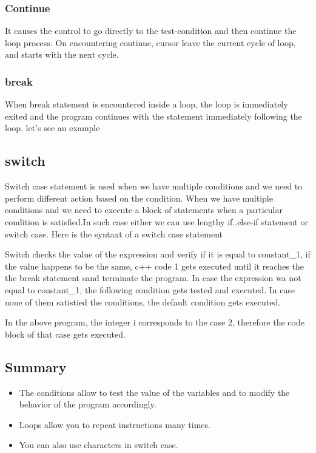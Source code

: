 \documentclass[11pt, a4paper]{article}
\begin{document}
\subsubsection{Continue}
It causes the control to go directly to the test-condition and then continue the loop process.
On encountering continue, cursor leave the current cycle of loop, and starts with the next cycle.


\subsubsection{break}
When break statement is encountered inside a loop, the loop is immediately exited and the program
continues with the statement immediately following the loop. let's see an example


\subsection{switch}
Switch case statement is used when we have multiple conditions and we need to perform different
action based on the condition. When we have multiple conditions and we need to execute a block of
statements when a particular condition is satisfied.In such case either we can use lengthy
if..else-if statement or switch case. Here is the syntaxt of a switch case statement

Switch checks the value of the expression and verify if it is equal to constant\_1, if the value happens
to be the same, c++ code 1 gets executed until it reaches the the break statement sand terminate the
program. In case the expression wa not equal to constant\_1, the following condition gets tested
and executed. In case none of them satistied the conditions, the default condition gets executed.

In the above program, the integer i corresponds to the case 2, therefore the code block of that
case gets executed.

\subsection{Summary}
\begin{itemize}
    \item The conditions allow to test the value of the variables and to modify the behavior
     of the program accordingly.
     \item Loops allow you to repeat instructions many times.
     \item You can also use characters in switch case.
\end{itemize}
\end{document}
